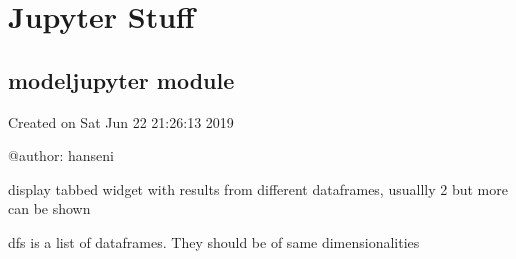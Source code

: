 \documentclass[letterpaper,10pt,english]{sphinxmanual}
\begin{document}
\begin{fulllineitems}

\begin{fulllineitems}
\label{\detokenize{plotly/modeldashsidebar:modeldashsidebar.Dash_graph.growthshow}}
\pysigstartsignatures
{}
\pysigstopsignatures
\end{fulllineitems}


\end{fulllineitems}


\sphinxstepscope


\section{Jupyter Stuff}
\label{\detokenize{jupyter/jupyter:jupyter-stuff}}\label{\detokenize{jupyter/jupyter::doc}}
\sphinxstepscope


\subsection{modeljupyter module}
\label{\detokenize{jupyter/modeljupyter:module-modeljupyter}}\label{\detokenize{jupyter/modeljupyter:modeljupyter-module}}\label{\detokenize{jupyter/modeljupyter::doc}}
\sphinxAtStartPar
Created on Sat Jun 22 21:26:13 2019

\sphinxAtStartPar
@author: hanseni

\begin{fulllineitems}
\label{\detokenize{jupyter/modeljupyter:modeljupyter.vis_alt3}}
\pysigstartsignatures
{}
\pysigstopsignatures
\sphinxAtStartPar
display tabbed widget with results from different dataframes, usuallly 2 but more can be shown

\sphinxAtStartPar
dfs is a list of dataframes. They should be of same dimensionalities

\end{fulllineitems}
\end{document}
